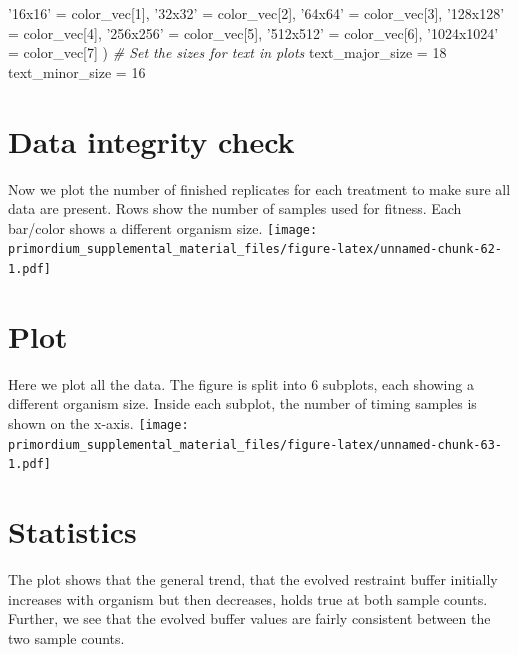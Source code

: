\documentclass[]{book}
\newenvironment{Shaded}{\begin{snugshade}}{\end{snugshade}}
\newcommand{\CommentTok}[1]{\textcolor[rgb]{0.56,0.35,0.01}{\textit{#1}}}
\newcommand{\DecValTok}[1]{\textcolor[rgb]{0.00,0.00,0.81}{#1}}
\newcommand{\NormalTok}[1]{#1}
\newcommand{\StringTok}[1]{\textcolor[rgb]{0.31,0.60,0.02}{#1}}
\begin{document}
\begin{Shaded}
\begin{Highlighting}[]
  \StringTok{'16x16'}\NormalTok{ =}\StringTok{     }\NormalTok{color_vec[}\DecValTok{1}\NormalTok{],}
  \StringTok{'32x32'}\NormalTok{ =}\StringTok{     }\NormalTok{color_vec[}\DecValTok{2}\NormalTok{],}
  \StringTok{'64x64'}\NormalTok{ =}\StringTok{     }\NormalTok{color_vec[}\DecValTok{3}\NormalTok{],}
  \StringTok{'128x128'}\NormalTok{ =}\StringTok{   }\NormalTok{color_vec[}\DecValTok{4}\NormalTok{],}
  \StringTok{'256x256'}\NormalTok{ =}\StringTok{   }\NormalTok{color_vec[}\DecValTok{5}\NormalTok{],}
  \StringTok{'512x512'}\NormalTok{ =}\StringTok{   }\NormalTok{color_vec[}\DecValTok{6}\NormalTok{],}
  \StringTok{'1024x1024'}\NormalTok{ =}\StringTok{ }\NormalTok{color_vec[}\DecValTok{7}\NormalTok{]}
\NormalTok{)}
\CommentTok{# Set the sizes for text in plots}
\NormalTok{text_major_size =}\StringTok{ }\DecValTok{18}
\NormalTok{text_minor_size =}\StringTok{ }\DecValTok{16} 
\end{Highlighting}
\end{Shaded}

\hypertarget{data-integrity-check-3}{%
\section{Data integrity check}\label{data-integrity-check-3}}

Now we plot the number of finished replicates for each treatment to make sure all data are present.
Rows show the number of samples used for fitness.
Each bar/color shows a different organism size.
\texttt{[image: primordium\_supplemental\_material\_files/figure-latex/unnamed-chunk-62-1.pdf]}

\hypertarget{plot}{%
\section{Plot}\label{plot}}

Here we plot all the data.
The figure is split into 6 subplots, each showing a different organism size.
Inside each subplot, the number of timing samples is shown on the x-axis.
\texttt{[image: primordium\_supplemental\_material\_files/figure-latex/unnamed-chunk-63-1.pdf]}

\hypertarget{statistics-3}{%
\section{Statistics}\label{statistics-3}}

The plot shows that the general trend, that the evolved restraint buffer initially increases with organism but then decreases, holds true at both sample counts.
Further, we see that the evolved buffer values are fairly consistent between the two sample counts.
\end{document}
